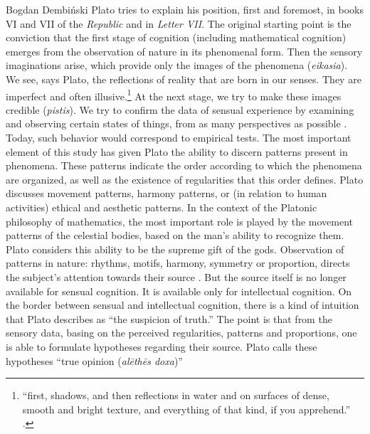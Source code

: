 \begin{artengenv}{Bogdan Dembiński}
Plato tries to explain his position, first and foremost, in books VI and VII of the \textit{Republic} and in
\textit{Letter VII}. The original starting point is the conviction that the first stage of cognition (including
mathematical cognition) emerges from the observation of nature in its phenomenal form. Then the sensory imaginations
arise, which provide only the images of the phenomena (\textit{eikasia}). We see, says Plato, the reflections of
reality that are born in our senses. They are imperfect and often illusive.\footnote{``first, shadows, and then
reflections in water and on surfaces of dense, smooth and bright texture, and everything of that kind, if you
apprehend.''
\parencite[\textit{Republic}, 510a]{plato_platonis_1955}.
} At the next stage, we try to make these images
credible (\textit{pistis}). We try to confirm the data of sensual experience by examining and observing certain states
of things, from as many perspectives as possible
\parencite[\textit{Republic}, 509d-511e]{plato_platonis_1955}.
Today,
such behavior would correspond to empirical tests. The most important element of this study %
has given Plato the ability to discern patterns present in phenomena. These patterns indicate the order according to
which the phenomena are organized, as well as the existence of regularities that this order defines. Plato
discusses movement patterns, harmony patterns, or (in relation to human activities) ethical and aesthetic patterns. In
the context of the Platonic philosophy of mathematics, the most important role is played by the movement patterns of
the celestial bodies, based on the man’s ability to recognize them. Plato considers this ability to be the supreme gift
of the gods. Observation of patterns in nature: rhythms, motifs, harmony, symmetry or proportion, directs the subject’s
attention towards their source
\parencite[\textit{Timaeus}, 47a-e]{plato_platonis_1955}.
But the source itself is no
longer available for sensual cognition. It is available only for intellectual cognition. On the border between sensual
and intellectual cognition, there is a kind of intuition that Plato describes as ``the suspicion of truth.'' The point is
that from the sensory data, basing on the perceived regularities, patterns and proportions, one is able to formulate
hypotheses regarding their source. Plato calls these hypotheses ``true opinion (\textit{al\=eth\=es doxa})''

\end{artengenv}
